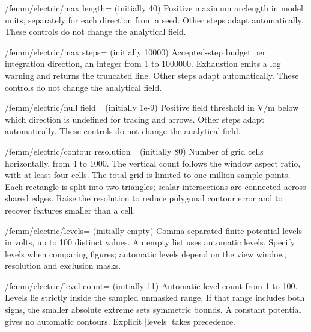 \begin{key}{/femm/electric/max length= (initially 40)}
Positive maximum arclength in model units, separately for each direction from a seed. Other steps adapt automatically. These controls do not change the analytical field.
\end{key}

\begin{key}{/femm/electric/max steps= (initially 10000)}
Accepted-step budget per integration direction, an integer from 1 to 1000000. Exhaustion emits a log warning and returns the truncated line. Other steps adapt automatically. These controls do not change the analytical field.
\end{key}

\begin{key}{/femm/electric/null field= (initially 1e-9)}
Positive field threshold in V/m below which direction is undefined for tracing and arrows. Other steps adapt automatically. These controls do not change the analytical field.
\end{key}

\begin{key}{/femm/electric/contour resolution= (initially 80)}
Number of grid cells horizontally, from 4 to 1000. The vertical count follows
the window aspect ratio, with at least four cells. The total grid is limited to
one million sample points. Each rectangle is split into two triangles; scalar
intersections are connected across shared edges. Raise the resolution to reduce
polygonal contour error and to recover features smaller than a cell.
\end{key}

\begin{key}{/femm/electric/levels= (initially \normalfont empty)}
Comma-separated finite potential levels in volts, up to 100 distinct values.
An empty list uses automatic levels. Specify levels when comparing figures;
automatic levels depend on the view window, resolution and exclusion masks.
\end{key}

\begin{key}{/femm/electric/level count= (initially 11)}
Automatic level count from 1 to 100. Levels lie strictly inside the sampled
unmasked range. If that range includes both signs, the smaller absolute extreme
sets symmetric bounds. A constant potential gives no automatic contours.
Explicit |levels| takes precedence.
\end{key}

